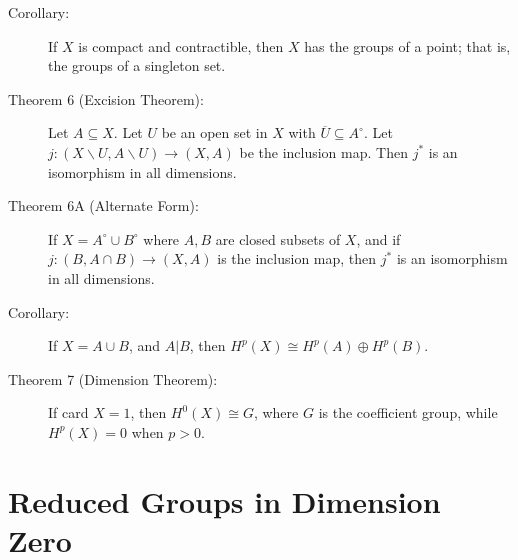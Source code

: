 \documentclass{article}
\begin{document}
\begin{description}
\item[Corollary:] If $X$ is compact and contractible, then $X$ has the groups of a point; that is, the groups of a singleton set.

\item[Theorem 6 (Excision Theorem):] Let $A \subseteq X$. Let $U$ be an open set in $X$ with $\overline U \subseteq A^{\circ}$. Let $j: (X \backslash U, A \backslash U) \longrightarrow (X,A)$ be the inclusion map. Then $j^*$ is an isomorphism in all dimensions.

\item[Theorem 6A (Alternate Form):] If $X = A^{\circ} \cup B^{\circ}$ where $A,B$ are closed subsets of $X$, and if $j: (B,A \cap B) \longrightarrow (X,A)$ is the inclusion map, then $j^*$ is an isomorphism in all dimensions.

\item[Corollary:] If $X = A \cup B$, and $A \vert B$, then $H^p(X) \cong H^p(A) \oplus H^p(B)$.

\item[Theorem 7 (Dimension Theorem):] If card $X = 1$, then $H^0(X) \cong G$, where $G$ is the coefficient group, while $H^p(X)=0$ when $p>0$.

\end{description}



\section{Reduced Groups in Dimension Zero}
\end{document}
